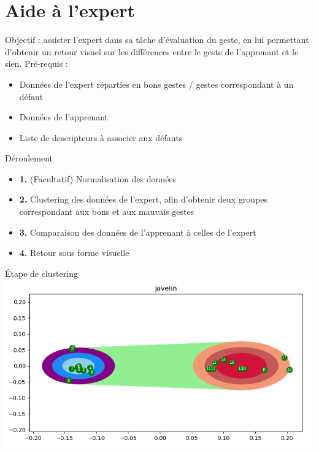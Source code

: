 \documentclass[svgnames]{beamer}
\begin{document}
	\section{Aide à l'expert}
	\begin{frame}{\secname}
	Objectif : assister l'expert dans sa tâche d'évaluation du geste, en lui permettant d'obtenir un retour visuel sur les différences entre le geste de l'apprenant et le sien.
	Pré-requis :
	\begin{itemize}[label=$\bullet$]
		\item Données de l'expert réparties en bons gestes / gestes correspondant à un défaut
		\item Données de l'apprenant
		\item Liste de descripteurs à associer aux défauts
	\end{itemize}
	\end{frame}
	
	\begin{frame}{Déroulement}
	\begin{itemize}
		\item \textbf{1.} (Facultatif) Normalisation des données
		\item \textbf{2.} Clustering des données de l'expert, afin d'obtenir deux groupes correspondant aux bons et aux mauvais gestes
		\item \textbf{3.} Comparaison des données de l'apprenant à celles de l'expert
		\item \textbf{4.} Retour sous forme visuelle
	\end{itemize}
	
	\end{frame}
	
	\begin{frame}{Étape de clustering}
	\centering
		\includegraphics[scale=0.5]{img/feedback_expert_cluster_example.png}
	\end{frame}
	
\end{document}
